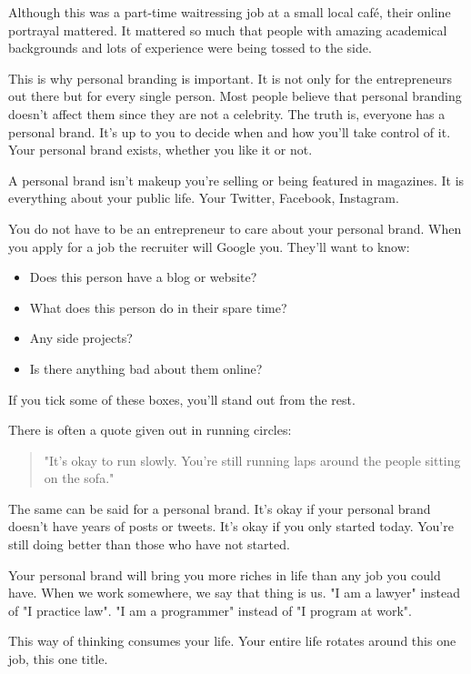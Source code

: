 \documentclass{article}
\begin{document}
Although this was a part-time waitressing job at a small local café,
their online portrayal mattered. It mattered so much that people with
amazing academical backgrounds and lots of experience were being tossed
to the side.

This is why personal branding is important. It is not only for the
entrepreneurs out there but for every single person. Most people believe
that personal branding doesn't affect them since they are not a
celebrity. The truth is, everyone has a personal brand. It's up to you
to decide when and how you'll take control of it. Your personal brand
exists, whether you like it or not.

A personal brand isn't makeup you're selling or being featured in
magazines. It is everything about your public life. Your Twitter,
Facebook, Instagram.

You do not have to be an entrepreneur to care about your personal brand.
When you apply for a job the recruiter will Google you. They'll want to
know:

\begin{itemize}
\item
  Does this person have a blog or website?
\item
  What does this person do in their spare time?
\item
  Any side projects?
  \item Is there anything bad about them online?
\end{itemize}

If you tick some of these boxes, you'll stand out from the rest.

There is often a quote given out in running circles:

\begin{quote}"It's okay to run slowly. You're still running laps around the people sitting on the sofa." \end{quote}

The same can be said for a personal brand. It's okay if your personal
brand doesn't have years of posts or tweets. It's okay if you only
started today. You're still doing better than those who have not
started.

Your personal brand will bring you more riches in life than any job you
could have. When we work somewhere, we say that thing is us. "I am a
lawyer" instead of "I practice law". "I am a programmer" instead of "I
program at work".

This way of thinking consumes your life. Your entire life rotates around
this one job, this one title.
\end{document}

